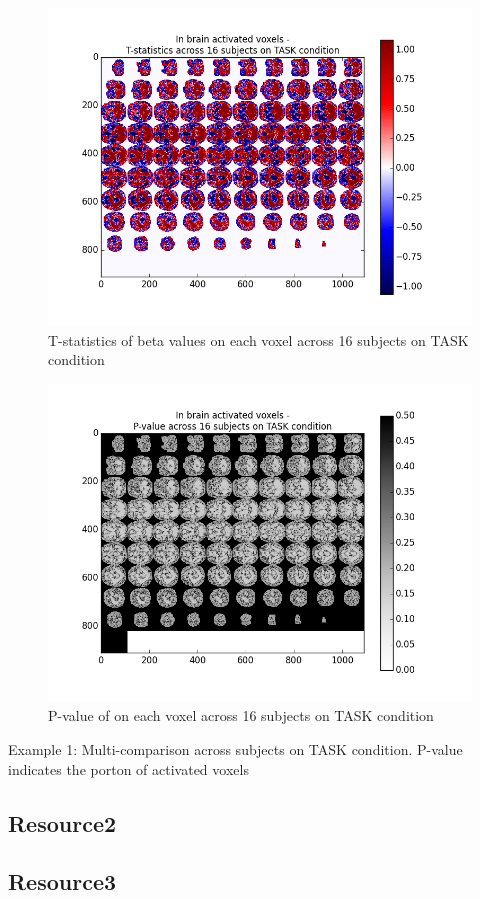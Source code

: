 \begin{figure}[H] 
\centering \includegraphics[scale=0.5]{../fig/multi_beta/tstat_task.png}	 
\caption{T-statistics of beta values on each voxel across 16 subjects on TASK condition}
\end{figure} 

\begin{figure}[H] 
\centering \includegraphics[scale=0.5]{../fig/multi_beta/pval_task.png}	 
\caption{P-value of on each voxel across 16 subjects on TASK condition}
\end{figure} 

\begin{center}
Example 1: Multi-comparison across subjects on TASK condition. P-value indicates the porton of activated
voxels
\end{center}



\subsection{Resource2}

\subsection{Resource3}